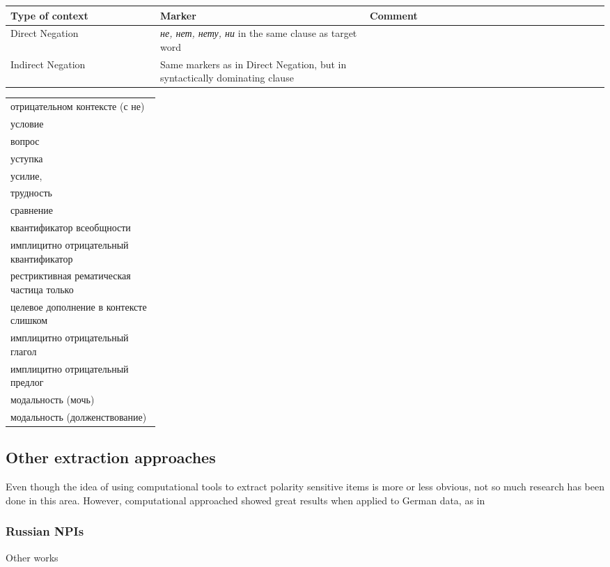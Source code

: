 \documentclass[a4paper,12pt]{article}
\begin{document}
	\begin{longtable}{|p{0.25\linewidth}|p{0.35\linewidth}|p{0.4\linewidth}|}
		\hline
		\textbf{Type of context} & \textbf{Marker} & \textbf{Comment} \\ \hline
		Direct Negation & \textit{не, нет, нету, ни} in the same clause as target word & \\ \hline
		Indirect Negation & Same markers as in Direct Negation, but in syntactically dominating clause & \\ \hline
		
	\end{longtable} 
	\begin{longtable}{|p{0.25\linewidth}}
    отрицательном контексте (с не)	\\
    условие 	\\
    вопрос	\\
    уступка	\\
    усилие, \\
    трудность	\\
    сравнение	\\
    квантификатор всеобщности	\\
    имплицитно отрицательный квантификатор	\\
    рестриктивная рематическая частица только\\	
    целевое дополнение в контексте слишком	\\
    имплицитно отрицательный глагол	\\
    имплицитно отрицательный предлог	\\
    модальность (мочь)	\\
    модальность (долженствование) \\
    \end{longtable} 
	
	\subsection{Other extraction  approaches}
	Even though the idea of using computational tools to extract polarity sensitive items is more or less obvious, not so much research has been done in this area. However, computational approached showed great results when applied to German data, as in 
	
	\subsubsection{Russian NPIs}
	
	Other works \parencite{multiwordnpiger}
	
\end{document}
